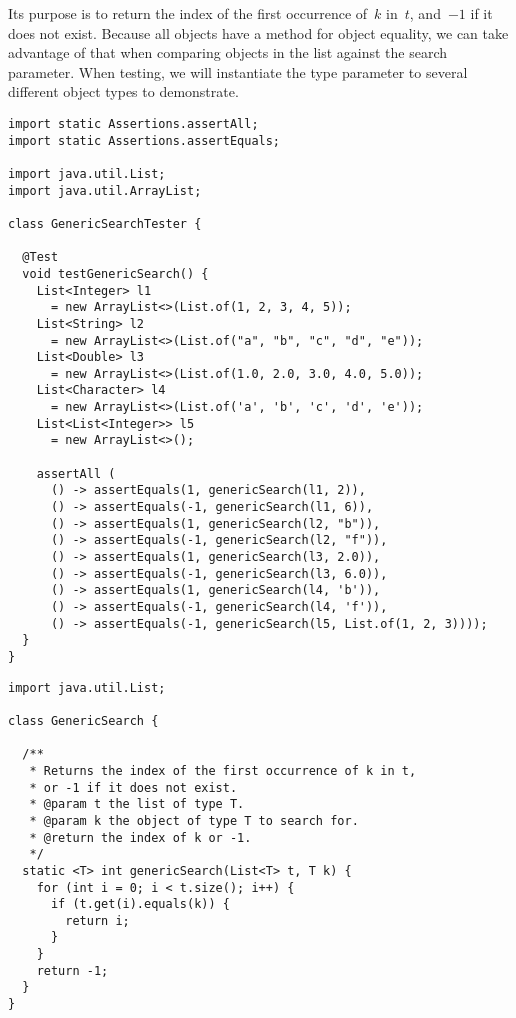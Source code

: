 Its purpose is to return the index of the first occurrence of~$k$ in~$t$, and~$-1$ if it does not exist. 
Because all objects have a  method for object equality, we can take advantage of that when comparing objects in the list against the search parameter. 
When testing, we will instantiate the type parameter to several different object types to demonstrate.

\begin{lstlisting}[language=MyJava]
import static Assertions.assertAll;
import static Assertions.assertEquals;

import java.util.List;
import java.util.ArrayList;

class GenericSearchTester {

  @Test 
  void testGenericSearch() {
    List<Integer> l1 
      = new ArrayList<>(List.of(1, 2, 3, 4, 5));
    List<String> l2 
      = new ArrayList<>(List.of("a", "b", "c", "d", "e"));
    List<Double> l3 
      = new ArrayList<>(List.of(1.0, 2.0, 3.0, 4.0, 5.0));
    List<Character> l4 
      = new ArrayList<>(List.of('a', 'b', 'c', 'd', 'e'));
    List<List<Integer>> l5 
      = new ArrayList<>();

    assertAll (
      () -> assertEquals(1, genericSearch(l1, 2)),
      () -> assertEquals(-1, genericSearch(l1, 6)),
      () -> assertEquals(1, genericSearch(l2, "b")),
      () -> assertEquals(-1, genericSearch(l2, "f")),
      () -> assertEquals(1, genericSearch(l3, 2.0)),
      () -> assertEquals(-1, genericSearch(l3, 6.0)),
      () -> assertEquals(1, genericSearch(l4, 'b')),
      () -> assertEquals(-1, genericSearch(l4, 'f')),
      () -> assertEquals(-1, genericSearch(l5, List.of(1, 2, 3))));
  }
}
\end{lstlisting}

\begin{lstlisting}[language=MyJava]
import java.util.List;

class GenericSearch {

  /**
   * Returns the index of the first occurrence of k in t, 
   * or -1 if it does not exist.
   * @param t the list of type T.
   * @param k the object of type T to search for.
   * @return the index of k or -1.
   */
  static <T> int genericSearch(List<T> t, T k) {
    for (int i = 0; i < t.size(); i++) {
      if (t.get(i).equals(k)) { 
        return i; 
      }
    }
    return -1;
  }
}
\end{lstlisting}

